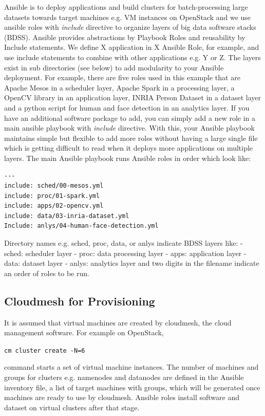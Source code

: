 Ansible is to deploy applications and build clusters for
batch-processing large datasets towards target machines e.g. VM
instances on OpenStack and we use ansible roles with \emph{include}
directive to organize layers of big data software stacks (BDSS). Ansible
provides abstractions by Playbook Roles and reusability by Include
statements. We define X application in X Ansible Role, for example, and
use include statements to combine with other applications e.g. Y or Z.
The layers exist in sub directories (see below) to add modularity to
your Ansible deployment. For example, there are five roles used in this
example that are Apache Mesos in a scheduler layer, Apache Spark in a
processing layer, a OpenCV library in an application layer, INRIA Person
Dataset in a dataset layer and a python script for human and face
detection in an analytics layer. If you have an additional software
package to add, you can simply add a new role in a main ansible playbook
with \emph{include} directive. With this, your Ansible playbook
maintains simple but flexible to add more roles without having a large
single file which is getting difficult to read when it deploys more
applications on multiple layers. The main Ansible playbook runs Ansible
roles in order which look like:

\begin{lstlisting}
---
include: sched/00-mesos.yml
include: proc/01-spark.yml
include: apps/02-opencv.yml
include: data/03-inria-dataset.yml
Include: anlys/04-human-face-detection.yml
\end{lstlisting}

Directory names e.g. sched, proc, data, or anlys indicate BDSS layers
like: - sched: scheduler layer - proc: data processing layer - apps:
application layer - data: dataset layer - anlys: analytics layer and two
digits in the filename indicate an order of roles to be run.

\subsection{Cloudmesh for
Provisioning}\label{cloudmesh-for-provisioning}

It is assumed that virtual machines are created by cloudmesh, the cloud
management software. For example on OpenStack,

\texttt{cm\ cluster\ create\ -N=6}

command starts a set of virtual machine instances. The number of
machines and groups for clusters e.g. namenodes and datanodes are
defined in the Ansible inventory file, a list of target machines with
groups, which will be generated once machines are ready to use by
cloudmesh. Ansible roles install software and dataset on virtual
clusters after that stage.

